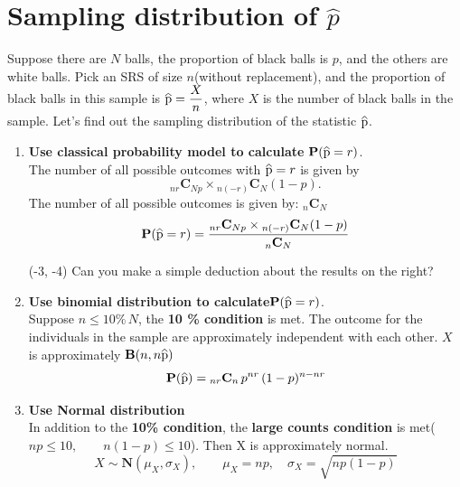 \documentclass[a4paper, 12pt,twoside]{book}
\newcommand\reallywidehat[1]{%
\savestack{\tmpbox}{\stretchto{%
  \scaleto{%
    \scalerel*[\widthof{\ensuremath{#1}}]{\kern-.6pt\bigwedge\kern-.6pt}%
    {\rule[-\textheight/2]{1ex}{\textheight}}%
  }{\textheight}%
}{0.5ex}}%
\stackon[1pt]{#1}{\tmpbox}%
}
\begin{document}
\section{Sampling distribution of $\hat{p}$}
Suppose there are $N$ balls, the proportion of black balls is $p$, and the others are white balls. Pick an SRS of size $n$(without replacement), and the proportion of black balls in this sample is $\displaystyle{\reallywidehat{p} = \frac{X}{n}}$, where $X$ is the number of black balls in the sample. Let's find out the sampling distribution of the statistic $\reallywidehat{p}$.
    \begin{enumerate}[(1)]
        \item \textbf{Use classical probability model to calculate} $\textbf{P}(\reallywidehat{p} = r)$.\vspace{0.3cm}\\
        The number of all possible outcomes with $\reallywidehat{p} = r$ is given by 
        $${}_{nr}\textbf{C}_{Np}\times {}_{n(-r)}\textbf{C}_N(1-p).$$
        The number of all possible outcomes is given by: ${}_n\textbf{C}_N$\vspace{0.3cm}\\
        $$\textbf{P}(\reallywidehat{p} = r) = \frac{{}_{nr}\textbf{C}_{Np}\times {}_{n(-r)}\textbf{C}_N(1-p)}{{}_n\textbf{C}_N}$$
        \begin{textblock}{3}(-3, -4)
        Can you make a simple deduction about the results  on the right?
        \end{textblock}
        
        \item \textbf{Use binomial distribution to calculate}$\textbf{P}(\reallywidehat{p} = r)$.\vspace{0.3cm}\\
        Suppose $n \leq 10\%\,N$, the \textbf{10 \% condition} is met. The outcome for the individuals in the sample are approximately independent with each other. $X$ is approximately $\textbf{B}(n, n\reallywidehat{p})$\vspace{0.3cm}\\
        $$\textbf{P}(\reallywidehat{p}) = {}_{nr}\textbf{C}_n\,p^{nr}\,(1-p)^{n-nr}$$
        \item \textbf{Use Normal distribution}\vspace{0.3cm}\\
        In addition to the \textbf{10\% condition}, the \textbf{large counts condition} is met($np \leq 10, \qquad n(1-p) \leq 10$). Then X is approximately normal. 
        $$X \sim \textbf{N}(\mu_X, \sigma_X), \qquad \mu_X = np,\quad \sigma_X = \sqrt{np(1-p)}$$
        

\end{enumerate}
\end{document}
